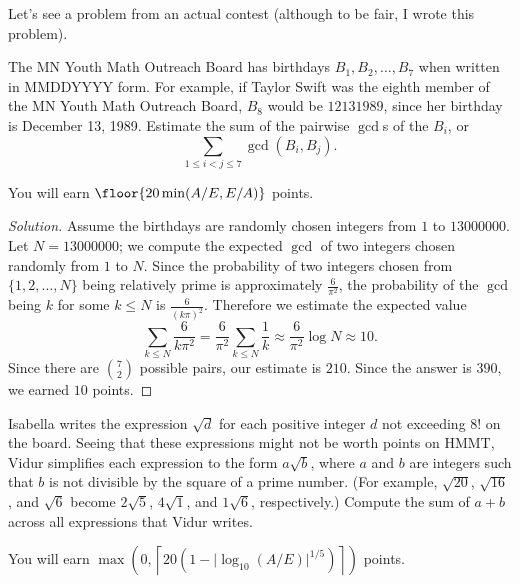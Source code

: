 \documentclass[11pt]{scrartcl}
\renewenvironment{solution}{\renewcommand\qedsymbol{$\blacksquare$}\begin{proof}[Solution]}{\end{proof}}
\begin{document}
Let's see a problem from an actual contest (although to be fair, I wrote this problem).

\begin{example}
	The MN Youth Math Outreach Board has birthdays $B_1,B_2,\dots,B_7$ when written in MMDDYYYY form. For example, if Taylor Swift was the eighth member of the MN Youth Math Outreach Board, $B_8$ would be $12131989$, since her birthday is December 13, 1989. Estimate the sum of the pairwise $\gcd$s of the $B_i$, or
	\[\sum_{1 \le i < j \le 7}\gcd(B_i,B_j).\]
	
	You will earn $\floor{20\min(A/E,E/A)}$ points.
\end{example}

\begin{solution}
	Assume the birthdays are randomly chosen integers from $1$ to $13000000$. Let $N = 13000000$; we compute the expected $\gcd$ of two integers chosen randomly from $1$ to $N$. Since the probability of two integers chosen from $\{1,2,\dots,N\}$ being relatively prime is approximately $\frac{6}{\pi^2}$, the probability of the $\gcd$ being $k$ for some $k \le N$ is $\frac{6}{(k\pi)^2}$. Therefore we estimate the expected value
	\[\sum_{k \le N}\frac{6}{k\pi^2} = \frac{6}{\pi^2}\sum_{k \le N}\frac 1k \approx \frac{6}{\pi^2}\log N \approx 10.\]
	Since there are $\binom{7}{2}$ possible pairs, our estimate is $210$. Since the answer is $390$, we earned $10$ points.
\end{solution}

\begin{example}
	Isabella writes the expression $\sqrt d$ for each positive integer $d$ not exceeding $8!$ on the board. Seeing that these expressions might not be worth points on HMMT, Vidur simplifies each expression to the form $a\sqrt b$, where $a$ and $b$ are integers such that $b$ is not divisible by the square of a prime number. (For example, $\sqrt{20}$, $\sqrt{16}$, and $\sqrt6$ become $2\sqrt5$, $4\sqrt1$, and $1\sqrt6$, respectively.) Compute the sum of $a + b$ across all expressions that Vidur writes.

	You will earn $\max\left(0,\left\lceil{20\left(1 - \lvert\log_{10}(A/E)\rvert^{1/5}\right)}\right\rceil\right)$ points.
\end{example}
\end{document}
